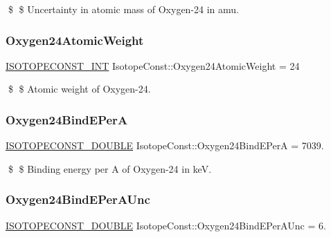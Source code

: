 \$ \$ Uncertainty in atomic mass of Oxygen-\/24 in amu. \mbox{\label{group___isotope_const-_oxygen-_o24_gaaf4a2a05c1edf3a7a649468bc5f1ff1a}} 
\subsubsection{\texorpdfstring{Oxygen24\+Atomic\+Weight}{Oxygen24AtomicWeight}}
{\footnotesize\ttfamily \mbox{\hyperlink{group___isotope_const-_macros_ga5f18360b3e99483a35c32d789e62621c}{I\+S\+O\+T\+O\+P\+E\+C\+O\+N\+S\+T\+\_\+\+I\+NT}} Isotope\+Const\+::\+Oxygen24\+Atomic\+Weight = 24}

\$ \$ Atomic weight of Oxygen-\/24. \mbox{\label{group___isotope_const-_oxygen-_o24_ga58380eced931e312b5b0ffca5f643a17}} 
\subsubsection{\texorpdfstring{Oxygen24\+Bind\+E\+PerA}{Oxygen24BindEPerA}}
{\footnotesize\ttfamily \mbox{\hyperlink{group___isotope_const-_macros_ga8f45a7272ce02c0b4c65c44636ed719a}{I\+S\+O\+T\+O\+P\+E\+C\+O\+N\+S\+T\+\_\+\+D\+O\+U\+B\+LE}} Isotope\+Const\+::\+Oxygen24\+Bind\+E\+PerA = 7039.}

\$ \$ Binding energy per A of Oxygen-\/24 in keV. \mbox{\label{group___isotope_const-_oxygen-_o24_gaa4f589d1d3053fb692d07208bf0c2d2b}} 
\subsubsection{\texorpdfstring{Oxygen24\+Bind\+E\+Per\+A\+Unc}{Oxygen24BindEPerAUnc}}
{\footnotesize\ttfamily \mbox{\hyperlink{group___isotope_const-_macros_ga8f45a7272ce02c0b4c65c44636ed719a}{I\+S\+O\+T\+O\+P\+E\+C\+O\+N\+S\+T\+\_\+\+D\+O\+U\+B\+LE}} Isotope\+Const\+::\+Oxygen24\+Bind\+E\+Per\+A\+Unc = 6.}

